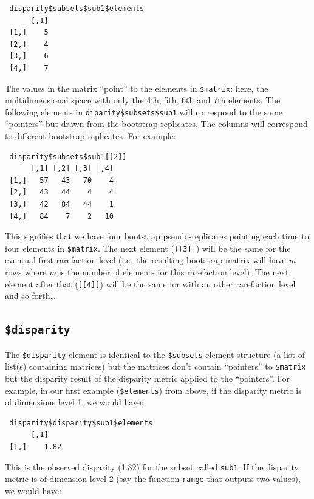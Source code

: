 \documentclass[]{book}
\theoremstyle{definition}
\theoremstyle{definition}
\theoremstyle{remark}
\begin{document}
\begin{verbatim}
 disparity$subsets$sub1$elements
      [,1]
 [1,]    5
 [2,]    4
 [3,]    6
 [4,]    7
\end{verbatim}

The values in the matrix ``point'' to the elements in \texttt{\$matrix}:
here, the multidimensional space with only the 4th, 5th, 6th and 7th
elements. The following elements in \texttt{diparity\$subsets\$sub1}
will correspond to the same ``pointers'' but drawn from the bootstrap
replicates. The columns will correspond to different bootstrap
replicates. For example:

\begin{verbatim}
 disparity$subsets$sub1[[2]]
      [,1] [,2] [,3] [,4]
 [1,]   57   43   70    4
 [2,]   43   44    4    4
 [3,]   42   84   44    1
 [4,]   84    7    2   10
\end{verbatim}

This signifies that we have four bootstrap pseudo-replicates pointing
each time to four elements in \texttt{\$matrix}. The next element
(\texttt{{[}{[}3{]}{]}}) will be the same for the eventual first
rarefaction level (i.e.~the resulting bootstrap matrix will have
\emph{m} rows where \emph{m} is the number of elements for this
rarefaction level). The next element after that (\texttt{{[}{[}4{]}{]}})
will be the same for with an other rarefaction level and so
forth\ldots{}

\subsection{\texorpdfstring{\texttt{\$disparity}}{\$disparity}}\label{disparity}

The \texttt{\$disparity} element is identical to the \texttt{\$subsets}
element structure (a list of list(s) containing matrices) but the
matrices don't contain ``pointers'' to \texttt{\$matrix} but the
disparity result of the disparity metric applied to the ``pointers''.
For example, in our first example (\texttt{\$elements}) from above, if
the disparity metric is of dimensions level 1, we would have:

\begin{verbatim}
 disparity$disparity$sub1$elements
      [,1]
 [1,]    1.82
\end{verbatim}

This is the observed disparity (1.82) for the subset called
\texttt{sub1}. If the disparity metric is of dimension level 2 (say the
function \texttt{range} that outputs two values), we would have:
\end{document}
